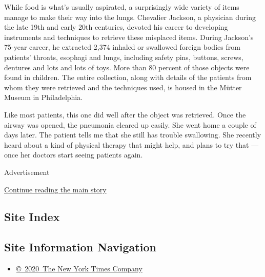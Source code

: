 While food is what's usually aspirated, a surprisingly wide variety of
items manage to make their way into the lungs. Chevalier Jackson, a
physician during the late 19th and early 20th centuries, devoted his
career to developing instruments and techniques to retrieve these
misplaced items. During Jackson's 75-year career, he extracted 2,374
inhaled or swallowed foreign bodies from patients' throats, esophagi and
lungs, including safety pins, buttons, screws, dentures and lots and
lots of toys. More than 80 percent of those objects were found in
children. The entire collection, along with details of the patients from
whom they were retrieved and the techniques used, is housed in the
Mütter Museum in Philadelphia.

Like most patients, this one did well after the object was retrieved.
Once the airway was opened, the pneumonia cleared up easily. She went
home a couple of days later. The patient tells me that she still has
trouble swallowing. She recently heard about a kind of physical therapy
that might help, and plans to try that --- once her doctors start seeing
patients again.

Advertisement

\protect\hyperlink{after-bottom}{Continue reading the main story}

\hypertarget{site-index}{%
\subsection{Site Index}\label{site-index}}

\hypertarget{site-information-navigation}{%
\subsection{Site Information
Navigation}\label{site-information-navigation}}

\begin{itemize}
\tightlist
\item
  \href{https://help.nytimes3xbfgragh.onion/hc/en-us/articles/115014792127-Copyright-notice}{©~2020~The
  New York Times Company}
\end{itemize}

